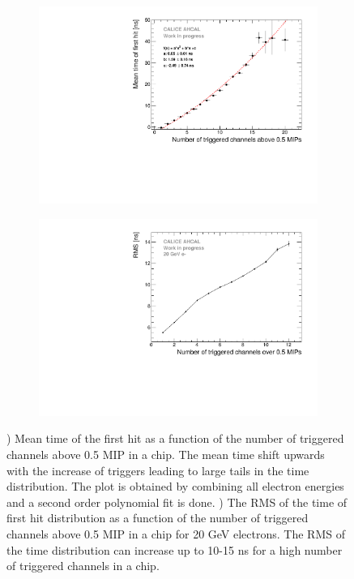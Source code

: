 \begin{figure}[htbp!]
	\begin{subfigure}[t]{0.5\textwidth}
		\centering
		\includegraphics[width=1\textwidth]{../Thesis_Plots/Timing/Electrons/Plots/NumberHits_Dependance_AllEnergies.pdf}
		\caption{}\label{fig:nhits_profile}
	\end{subfigure}
	\hfill
	\begin{subfigure}[t]{0.5\textwidth}
		\centering
		\includegraphics[width=1\textwidth]{../Thesis_Plots/Timing/Electrons/Plots/ParametrisationPedestalShift_20GeV.pdf}
		\caption{}\label{fig:RMS_nHits}
	\end{subfigure}
	\caption{) Mean time of the first hit as a function of the number of triggered channels above 0.5 MIP in a chip. The mean time shift upwards with the increase of triggers leading to large tails in the time distribution. The plot is obtained by combining all electron energies and a second order polynomial fit is done. ) The RMS of the time of first hit distribution as a function of the number of triggered channels above 0.5 MIP in a chip for 20 GeV electrons. The RMS of the time distribution can increase up to 10-15 ns for a high number of triggered channels in a chip.}
\end{figure}

